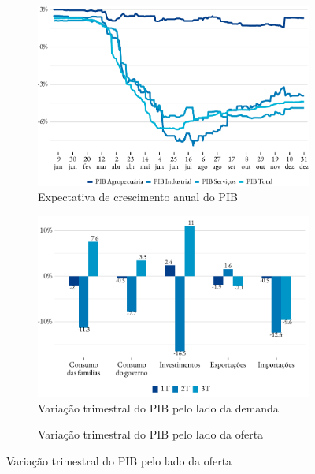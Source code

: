 \begin{figure}[!h]
	\begin{subfigure}{\linewidth}
		\caption{Expectativa de crescimento anual do PIB}
		\label{fig:expectativa_pib}
		\includegraphics{fig/pib_expec-1.pdf}
	\end{subfigure}
	\begin{subfigure}{\linewidth}
		\caption{Variação trimestral do PIB pelo lado da demanda}
		\label{fig:pib_demanda}
		\includegraphics{fig/pib_demanda.pdf}
	\end{subfigure}
	\begin{subfigure}{\linewidth}
		\caption{Variação trimestral do PIB pelo lado da oferta}
		\label{fig:pib_oferta}

\end{subfigure}
\end{figure}
